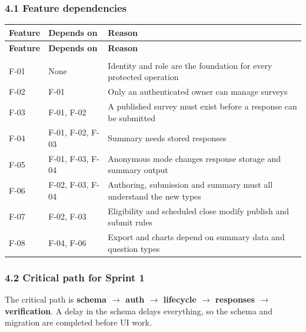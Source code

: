 \documentclass[12pt,a4paper]{article}
\begin{document}
\subsubsection*{4.1 Feature dependencies}
{\setlength{\tabcolsep}{3pt}\renewcommand{\arraystretch}{1.08}\small
\begin{longtable}{@{}>{\raggedright\arraybackslash}p{}>{\raggedright\arraybackslash}p{}>{\raggedright\arraybackslash}p{}@{}}
\toprule
\textbf{Feature} & \textbf{Depends on} & \textbf{Reason} \\
\midrule
\endfirsthead
\toprule
\textbf{Feature} & \textbf{Depends on} & \textbf{Reason} \\
\midrule
\endhead
\midrule
\multicolumn{3}{r}{\footnotesize\textit{Continued on next page}}\\
\endfoot
\bottomrule
\endlastfoot
F-01 & None & Identity and role are the foundation for every protected operation \\
F-02 & F-01 & Only an authenticated owner can manage surveys \\
F-03 & F-01, F-02 & A published survey must exist before a response can be submitted \\
F-04 & F-01, F-02, F-03 & Summary needs stored responses \\
F-05 & F-01, F-03, F-04 & Anonymous mode changes response storage and summary output \\
F-06 & F-02, F-03, F-04 & Authoring, submission and summary must all understand the new types \\
F-07 & F-02, F-03 & Eligibility and scheduled close modify publish and submit rules \\
F-08 & F-04, F-06 & Export and charts depend on summary data and question types \\
\end{longtable}}

\subsubsection*{4.2 Critical path for Sprint 1}


The critical path is \textbf{schema $\rightarrow$ auth $\rightarrow$ lifecycle $\rightarrow$ responses $\rightarrow$ verification}. A delay in the schema delays everything, so the schema and migration are completed before UI work.
\end{document}
